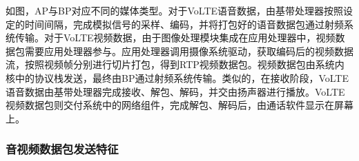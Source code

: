 
如图，AP与BP对应不同的媒体类型。对于VoLTE语音数据，由基带处理器按照设定的时间间隔，完成模拟信号的采样、编码，并将打包好的语音数据包通过射频系统传输。对于VoLTE视频数据，由于图像处理模块集成在应用处理器中，视频数据包需要应用处理器参与。应用处理器调用摄像系统驱动，获取编码后的视频数据流，按照视频帧分别进行切片打包，得到RTP视频数据包。视频数据包由系统内核中的协议栈发送，最终由BP通过射频系统传输。类似的，在接收阶段，VoLTE语音数据由基带处理器完成接收、解包、解码，并交由扬声器进行播放。VoLTE视频数据包则交付系统中的网络组件，完成解包、解码后，由通话软件显示在屏幕上。

\subsubsection{音视频数据包发送特征}
\label{chap:backinfo:volte:packets:send}


